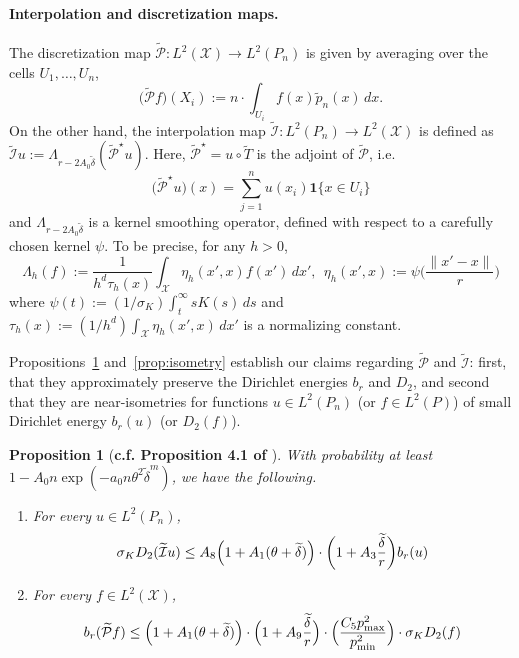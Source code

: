 \documentclass[twoside]{article}
\newcommand{\1}{\mathbf{1}}
\newcommand{\Xset}{\mathcal{X}}
\newcommand{\Leb}{L}
\newcommand{\mc}[1]{\mathcal{#1}}
\newcommand{\wt}[1]{\widetilde{#1}}
\newtheorem{proposition}{Proposition}
\theoremstyle{definition}
\theoremstyle{remark}
\begin{document}
\paragraph{Interpolation and discretization maps.}
The discretization map  $\wt{\mathcal{P}}: \Leb^2(\Xset) \to \Leb^2(P_n)$ is given by averaging over the cells $U_1,\ldots,U_n$, 
\begin{equation*}
\bigl(\wt{\mathcal{P}}f\bigr)(X_i) := n \cdot \int_{U_i} f(x) \wt{p}_n(x) \,dx.
\end{equation*}
On the other hand, the interpolation map $\wt{\mc{I}}: \Leb^2(P_n) \to \Leb^2(\Xset)$ is defined as $\wt{\mc{I}}u := \Lambda_{r - 2A_0\wt{\delta}}(\wt{\mc{P}}^{\star}u)$. Here, $\wt{\mc{P}}^{\star} = u \circ \wt{T}$ is the adjoint of $\wt{\mc{P}}$, i.e.
\begin{equation*}
\bigl(\wt{\mc{P}}^{\star}u\bigr)(x) = \sum_{j = 1}^{n} u(x_i) \1\{x \in U_i\} 
\end{equation*} 
and $\Lambda_{r - 2A_0\wt{\delta}}$ is a kernel smoothing operator, defined with respect to a carefully chosen kernel $\psi$. To be precise, for any $h > 0$,
\begin{equation*}
\Lambda_h(f) := \frac{1}{h^d\tau_h(x)}\int_{\Xset} \eta_h(x',x) f(x') \,dx',~~ \eta_h(x',x) := \psi\biggl(\frac{\|x' - x\|}{r}\biggr)
\end{equation*}
where $\psi(t) := (1/\sigma_K)\int_{t}^{\infty} s K(s) \,ds$ and $\tau_h(x) := (1/h^d)\int_{\Xset} \eta_h(x',x) \,dx'$ is a normalizing constant.

Propositions~\ref{prop:dirichlet_energies} and~\ref{prop:isometry} establish our claims regarding $\wt{\mc{P}}$ and $\wt{\mc{I}}$: first, that they approximately preserve the Dirichlet energies $b_r$ and $D_2$, and second that they are near-isometries for functions $u \in \Leb^2(P_n)$ (or $f \in \Leb^2(P)$) of small Dirichlet energy $b_r(u)$ (or $D_2(f)$).

\begin{proposition}[\textbf{c.f. Proposition 4.1 of \citet{calder2019}}]
	\label{prop:dirichlet_energies}
	With probability at least $1 - A_0n\exp(-a_0n\theta^2\wt{\delta}^{m})$, we have the following.
	\begin{enumerate}[(1)]
		\item For every $u \in \Leb^2(P_n)$,
		\begin{equation}
		\label{eqn:dirichlet_energies_1}
		\sigma_{K} D_2(\wt{\mc{I}}u) \leq A_8 \Bigl(1 + A_1(\theta + \wt{\delta})\Bigr) \cdot \biggl(1 + A_3\frac{\wt{\delta}}{r}\biggr) b_r(u)
		\end{equation}
		\item For every $f \in \Leb^2(\Xset)$,
		\begin{equation}
		\label{eqn:dirichlet_energies_2}
		b_r(\wt{\mc{P}}f) \leq \Bigl(1 + A_1(\theta + \wt{\delta})\Bigr) \cdot \Bigl(1 + A_9\frac{\wt{\delta}}{r}\Bigr) \cdot \Bigl(\frac{C_5 p_{\max}^2}{p_{\min}^2}\Bigr) \cdot \sigma_{K} D_2(f)
		\end{equation}
	\end{enumerate}
\end{proposition}
\end{document}
